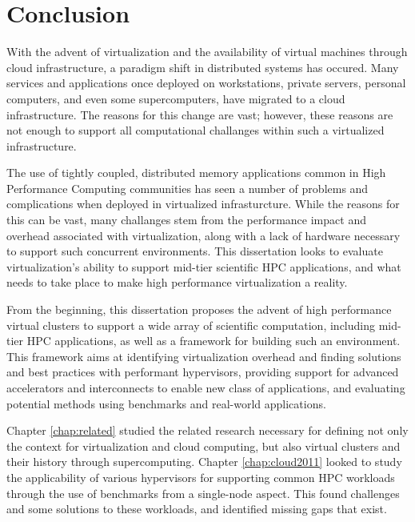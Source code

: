 
\chapter{Conclusion}
\label{chap:conc}

With the advent of virtualization and the availability of virtual machines through cloud infrastructure, a paradigm shift in distributed systems has occured. Many services and applications once deployed on workstations, private servers, personal computers, and even some supercomputers, have migrated to a cloud infrastructure. The reasons for this change are vast; however, these reasons are not enough to support all computational challanges within such a virtualized infrastructure.

The use of tightly coupled, distributed memory applications common in High Performance Computing communities has seen a number of problems and complications when deployed in virtualized infrasturcture.  While the reasons for this can be vast, many challanges  stem from the performance impact and overhead associated with virtualization, along with a lack of hardware necessary to support such concurrent environments. This dissertation looks to evaluate virtualization's ability to support mid-tier scientific HPC applications, and what needs to take place to make high performance virtualization a reality.

From the beginning, this dissertation proposes the advent of high performance virtual clusters to support a wide array of scientific computation, including mid-tier HPC applications, as well as a framework for building such an environment. This framework aims at identifying virtualization overhead and finding solutions and best practices with performant hypervisors, providing support for advanced accelerators and interconnects to enable new class of applications, and evaluating potential methods using benchmarks and real-world applications. 


Chapter \ref{chap:related} studied the related research necessary for defining not only the context for virtualization and cloud computing, but also virtual clusters and their history through supercomputing.  Chapter \ref{chap:cloud2011} looked to study the applicability of various hypervisors for supporting common HPC workloads through the use of benchmarks from a single-node aspect.  This found challenges and some solutions to these workloads, and identified missing gaps that exist. 

